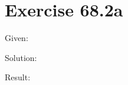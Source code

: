 \documentclass[a4paper, 10pt]{scrartcl}
\begin{document}
\section{Exercise 68.2a}

Given:

Solution:

Result:
\end{document}
